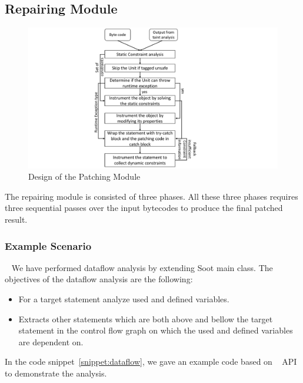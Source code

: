 \subsection{Repairing Module}
\label{subsec:RepairingModule}

\begin{figure}[t]
\centering
  \includegraphics[scale= .4]{images/PatchModule.pdf}
  \caption{Design of the Patching Module}
  \label{fig:PatchModule}
\end{figure}

The repairing module is consisted of three phases. All these three phases
requires three sequential passes over the input bytecodes to produce the final
patched result.

\subsubsection{Example Scenario}
\label{subsec:exampleScenario}
~\newline
We have performed dataflow analysis by extending Soot main class. The objectives
of the dataflow analysis are the following:

\begin{itemize}
  \item For a target statement analyze used and defined variables.
  
  \item Extracts other statements which are both above and bellow the target
  statement in the control flow graph on which the used and defined variables
  are dependent on.
  
\end{itemize}

In the code snippet~\ref{snippet:dataflow}, we gave an example code based on
\java\  API to demonstrate the analysis.


